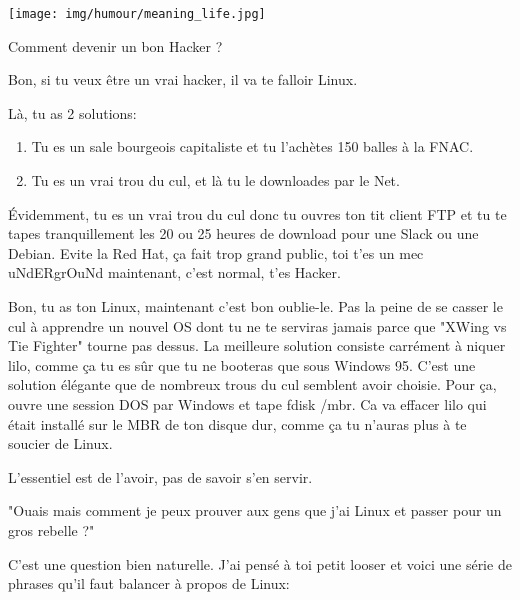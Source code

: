 	\begin{center}
	\texttt{[image: img/humour/meaning\_life.jpg]}
	\end{center}
	
\begin{center}\underline{\hspace{5 cm}}\end{center}	

Comment devenir un bon Hacker ?
	
	Bon, si tu veux être un vrai hacker, il va te falloir Linux.
	
	Là, tu as 2 solutions:
	\begin{enumerate}
		\item Tu es un sale bourgeois capitaliste et tu l'achètes 150 balles à la FNAC.
		
		\item Tu es un vrai trou du cul, et là tu le downloades par le Net.
	\end{enumerate}
	
	Évidemment, tu es un vrai trou du cul donc tu ouvres ton tit client FTP et tu te tapes tranquillement les 20 ou 25 heures de download pour une Slack ou une Debian. Evite la Red Hat, ça fait trop grand public, toi t'es un mec uNdERgrOuNd maintenant, c'est normal, t'es Hacker.
	
	Bon, tu as ton Linux, maintenant c'est bon oublie-le. Pas la peine de se casser le cul à apprendre un nouvel OS dont tu ne te serviras jamais parce que "XWing vs Tie Fighter" tourne pas dessus. La meilleure solution consiste carrément à niquer lilo, comme ça tu es sûr que tu ne booteras que sous Windows 95. C'est une solution élégante que de nombreux trous du cul semblent avoir choisie. Pour ça, ouvre une session DOS par Windows et tape fdisk /mbr. Ca va effacer lilo qui était installé sur le MBR de ton disque dur, comme ça tu n'auras plus à te soucier de Linux.
	
	L'essentiel est de l'avoir, pas de savoir s'en servir.
	
	"Ouais mais comment je peux prouver aux gens que j'ai Linux et passer pour un gros rebelle ?"
	
	C'est une question bien naturelle. J'ai pensé à toi petit looser et voici une série de phrases qu'il faut balancer à propos de Linux:
	
